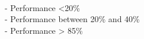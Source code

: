 {        \medskip     
        \vspace{1cm}
        \centering
        \\
        \vspace{0.5cm}
        \parbox[c]{7cm}{
        \begin{normalsize}
        \RaggedRight
         - Performance <20\% \\
        \vspace{0.2cm}
         - Performance between 20\% and 40\% \\
        \vspace{0.2cm}
         - Performance > 85\%
        
        \end{normalsize}}                                         
    }
